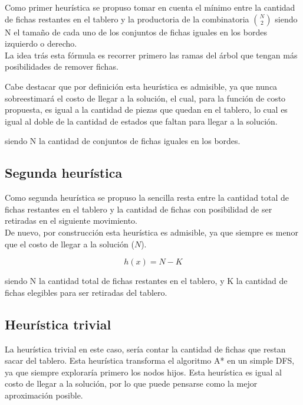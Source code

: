 \documentclass[a4paper,10pt]{article}
\begin{document}
    Como primer heurística se propuso tomar en cuenta el mínimo entre la cantidad de fichas restantes en el tablero y la productoria de la combinatoria  
    ${N \choose 2}$ siendo N el tamaño de cada uno de los conjuntos de fichas iguales en los bordes izquierdo o derecho.\\

    La idea trás esta fórmula es recorrer primero las ramas del árbol que tengan más posibilidades de remover fichas.

    Cabe destacar que por definición esta heurística es admisible, ya que nunca sobreestimará el costo de llegar a la solución, el cual, para la función de costo propuesta, es 
    igual a la cantidad de piezas que quedan en el tablero, lo cual es igual al doble de la cantidad de estados que faltan para llegar a la solución.



    siendo N la cantidad de conjuntos de fichas iguales en los bordes.
    
    \subsection{Segunda heurística}

    Como segunda heurística se propuso la sencilla resta entre la cantidad total de fichas restantes en el tablero y la cantidad de fichas con posibilidad de ser retiradas en el
    siguiente movimiento.\\

    De nuevo, por construcción esta heurística es admisible, ya que siempre es menor que el costo de llegar a la solución ($N$).

     \[ h(x) = N - K\] 

    siendo N la cantidad total de fichas restantes en el tablero, y K la cantidad de fichas elegibles para ser retiradas del tablero.

    \subsection{Heurística trivial}

    La heurística trivial en este caso, sería contar la cantidad de fichas que restan sacar del tablero. Esta heurística transforma el algoritmo A* en un simple DFS, 
    ya que siempre exploraría primero los nodos hijos. Esta heurística es igual al costo de llegar a la solución, por lo que puede pensarse como la mejor aproximación posible.
\end{document}
